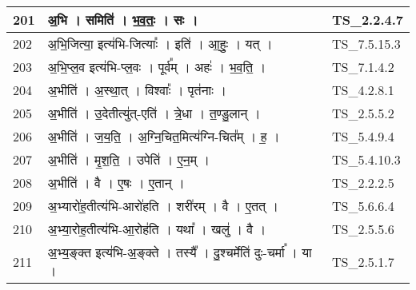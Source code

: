 \documentclass[17pt]{extarticle}
\begin{document}
\begin{longtable}{||p{0.4in}||p{4.9in}||p{0.9in}||}
    \hline
        
    201 & अ॒भि   ।   समिति॑   ।   भ॒व॒तः॒   ।   सः   ।    & TS\_2.2.4.7       \\
    
    \hline
        
    202 & अ॒भि॒जित्या॒ इत्य॑भि{-}जित्याः᳚   ।   इति॑   ।   आ॒हुः॒   ।   यत्   ।    & TS\_7.5.15.3       \\
    
    \hline
        
    203 & अ॒भि॒प्ल॒व इत्य॑भि{-}प्ल॒वः   ।   पूर्व᳚म्   ।   अहः॑   ।   भ॒व॒ति॒   ।    & TS\_7.1.4.2       \\
    
    \hline
        
    204 & अ॒भीति॑   ।   अ॒स्था॒त्   ।   विश्वाः᳚   ।   पृत॑नाः   ।    & TS\_4.2.8.1       \\
    
    \hline
        
    205 & अ॒भीति॑   ।   उ॒देतीत्यु॑त्{-}एति॑   ।   त्रे॒धा   ।   त॒ण्डु॒लान्   ।    & TS\_2.5.5.2       \\
    
    \hline
        
    206 & अ॒भीति॑   ।   ज॒य॒ति॒   ।   अ॒ग्नि॒चित॒मित्य॑ग्नि{-}चित᳚म्   ।   ह॒   ।    & TS\_5.4.9.4       \\
    
    \hline
        
    207 & अ॒भीति॑   ।   मृ॒श॒ति॒   ।   उपेति॑   ।   ए॒न॒म्   ।    & TS\_5.4.10.3       \\
    
    \hline
        
    208 & अ॒भीति॑   ।   वै   ।   ए॒षः   ।   ए॒तान्   ।    & TS\_2.2.2.5       \\
    
    \hline
        
    209 & अ॒भ्यारो॑ह॒तीत्य॑भि{-}आरो॑हति   ।   शरी॑रम्   ।   वै   ।   ए॒तत्   ।    & TS\_5.6.6.4       \\
    
    \hline
        
    210 & अ॒भ्या॒रोह॒तीत्य॑भि{-}आ॒रोह॑ति   ।   यथा᳚   ।   खलु॑   ।   वै   ।    & TS\_2.5.5.6       \\
    
    \hline
        
    211 & अ॒भ्य॒ङ्क्त इत्य॑भि{-}अ॒ङ्क्ते   ।   तस्यै᳚   ।   दु॒श्चर्मेति॑ दुः{-}चर्मा᳚   ।   या   ।    & TS\_2.5.1.7       \\
    

\end{longtable}
\end{document}
